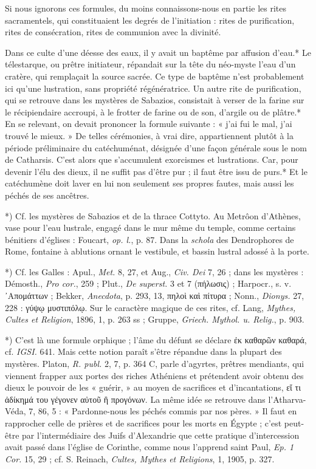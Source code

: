 \documentclass[a4paper, 11pt, oneside, polutonikogreek, french]{article}
\begin{document}
Si nous ignorons ces formules, du moins connaissons-nous en partie les rites sacramentels, qui constituaient les degrés de l'initiation : rites de purification, rites de consécration, rites de communion avec la divinité.

Dans ce culte d'une déesse des eaux, il y avait un baptême par affusion d'eau.* Le télestarque, ou prêtre initiateur, répandait sur la tête du néo-myste l'eau d'un cratère, qui remplaçait la source sacrée. Ce type de baptême n'est probablement ici qu'une lustration, sans propriété régénératrice. Un autre rite de purification, qui se retrouve dans les mystères de Sabazios, consistait à verser de la farine sur le récipiendaire accroupi, à le frotter de farine ou de son, d'argile ou de plâtre.* En se relevant, on devait prononcer la formule suivante : « j'ai fui le mal, j'ai trouvé le mieux. » De telles cérémonies, à vrai dire, appartiennent plutôt à la période préliminaire du catéchuménat, désignée d'une façon générale sous le nom de Catharsis. C'est alors que s'accumulent exorcismes et lustrations. Car, pour devenir l'élu des dieux, il ne suffit pas d'être pur ; il faut être issu de purs.* Et le catéchumène doit laver en lui non seulement ses propres fautes, mais aussi les péchés de ses ancêtres.

*) Cf. les mystères de Sabazios et de la thrace Cottyto. Au Metrôon d'Athènes, vase pour l'eau lustrale, engagé dans le mur même du temple, comme certains bénitiers d'églises : Foucart, \emph{op. l.}, p. 87. Dans la \emph{schola} des Dendrophores de Rome, fontaine à ablutions ornant le vestibule, et bassin lustral adossé à la porte.

*) Cf. les Galles : Apul., \emph{Met.} 8, 27, et Aug., \emph{Civ. Dei} 7, 26 ; dans les mystères : Démosth., \emph{Pro cor.}, 259 ; Plut., \emph{De superst.} 3 et 7 (πήλωσις) ; Harpocr., s. v. ᾿Απομάττων ; Bekker, \emph{Anecdota}, p. 293, 13, πηλοὶ καὶ πίτυρα ; Nonn., \emph{Dionys.} 27, 228 : γύψῳ μυστιπόλῳ. Sur le caractère magique de ces rites, cf. Lang, \emph{Mythes, Cultes et Religion}, 1896, 1, p. 263 ss ; Gruppe, \emph{Griech. Mythol. u. Relig.}, p. 903.

*) C'est là une formule orphique ; l'âme du défunt se déclare ἐκ καθαρῶν καθαρά, cf. \emph{IGSI.} 641. Mais cette notion paraît s'être répandue dans la plupart des mystères. Platon, \emph{R. publ.} 2, 7, p. 364 C, parle d'agyrtes, prêtres mendiants, qui viennent frapper aux portes des riches Athéniens et prétendent avoir obtenu des dieux le pouvoir de les « guérir, » au moyen de sacrifices et d'incantations, εἴ τι ἀδίκημά του γέγονεν αὐτοῦ ἢ προγόνων. La même idée se retrouve dans l'Atharva-Véda, 7, 86, 5 : « Pardonne-nous les péchés commis par nos pères. » Il faut en rapprocher celle de prières et de sacrifices pour les morts en Égypte ; c'est peut-être par l'intermédiaire des Juifs d'Alexandrie que cette pratique d'intercession avait passé dans l'église de Corinthe, comme nous l'apprend saint Paul, \emph{Ep. 1 Cor.} 15, 29 ; cf. S. Reinach, \emph{Cultes, Mythes et Religions}, 1, 1905, p. 327.
\end{document}
